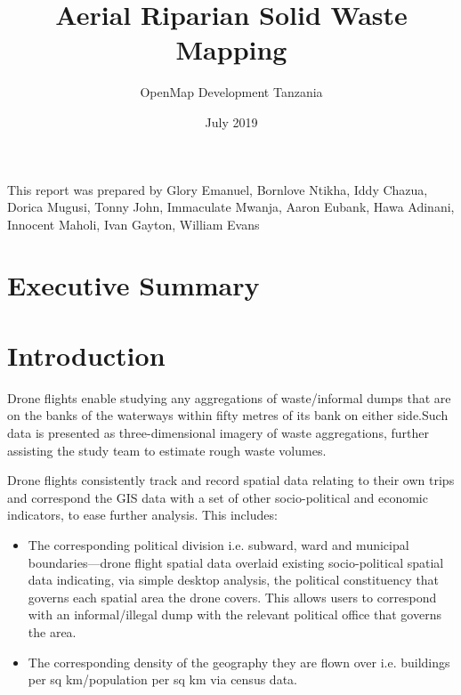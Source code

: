 \documentclass[a4paper,12pt,twoside]{article}
\title{Aerial Riparian Solid Waste Mapping}
\author{OpenMap Development Tanzania}
\date{July 2019}
\begin{document}
\maketitle

This report was prepared by Glory Emanuel, Bornlove Ntikha, Iddy Chazua, Dorica Mugusi, Tonny John, Immaculate Mwanja, Aaron Eubank, Hawa Adinani, Innocent Maholi, Ivan Gayton, William Evans

\newpage
\tableofcontents

\newpage
\section{Executive Summary}
\begin{multicols}{2}

\lipsum[0-3]

\end{multicols}

\section{Introduction}

\lipsum[0-4]
  
Drone flights enable studying any aggregations of waste/informal dumps that are on the banks of the waterways within fifty metres of its bank on either side.Such data is presented as three-dimensional imagery of waste aggregations, further assisting the study team to estimate rough waste volumes.

Drone flights consistently track and record spatial data relating to their own trips and correspond the GIS data with a set of other socio-political and economic indicators, to ease further analysis. This includes:   

\begin{itemize}
    \item The corresponding political division i.e. subward, ward and municipal boundaries—drone flight spatial data overlaid existing socio-political spatial data indicating, via simple desktop analysis, the political constituency that governs each spatial area the drone covers. This allows users to correspond with an informal/illegal dump with the relevant political office that governs the area.
    \item The corresponding density of the geography they are flown over i.e. buildings per sq km/population per sq km via census data. 
\end{itemize}
\end{document}
